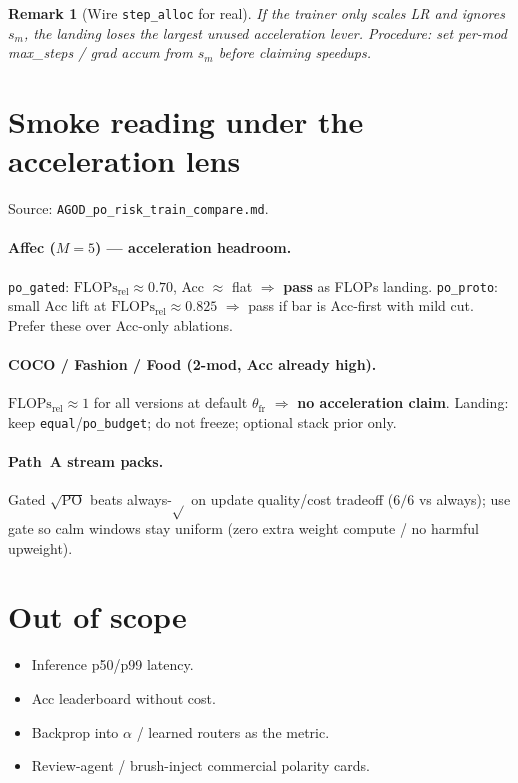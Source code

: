\documentclass[11pt]{article}
\newtheorem{remark}{Remark}
\newcommand{\PO}{\mathrm{PO}}
\newcommand{\Flops}{\mathrm{FLOPs}_{\mathrm{rel}}}
\begin{document}
\begin{remark}[Wire \texttt{step\_alloc} for real]
If the trainer only scales LR and ignores $s_m$, the landing loses
the largest unused acceleration lever.
Procedure: set per-mod max\_steps / grad accum from $s_m$ before
claiming speedups.
\end{remark}

\section{Smoke reading under the acceleration lens}
\label{sec:emp}

Source: \texttt{AGOD\_po\_risk\_train\_compare.md}.

\paragraph{Affec ($M{=}5$) --- acceleration headroom.}
\texttt{po\_gated}: $\Flops\approx 0.70$, Acc $\approx$ flat
$\Rightarrow$ \textbf{pass} as FLOPs landing.
\texttt{po\_proto}: small Acc lift at $\Flops\approx 0.825$
$\Rightarrow$ pass if bar is Acc-first with mild cut.
Prefer these over Acc-only ablations.

\paragraph{COCO / Fashion / Food (2-mod, Acc already high).}
$\Flops\approx 1$ for all versions at default $\theta_{\mathrm{fr}}$
$\Rightarrow$ \textbf{no acceleration claim}.
Landing: keep \texttt{equal}/\texttt{po\_budget}; do not freeze;
optional stack prior only.

\paragraph{Path~A stream packs.}
Gated $\sqrt{\PO}$ beats always-$\sqrt{}$ on update quality/cost
tradeoff ($6/6$ vs always); use gate so calm windows stay uniform
(zero extra weight compute / no harmful upweight).

\section{Out of scope}
\label{sec:out}

\begin{itemize}[leftmargin=1.2em,itemsep=2pt]
  \item Inference p50/p99 latency.
  \item Acc leaderboard without cost.
  \item Backprop into $\alpha$ / learned routers as the metric.
  \item Review-agent / brush-inject commercial polarity cards.
\end{itemize}
\end{document}
